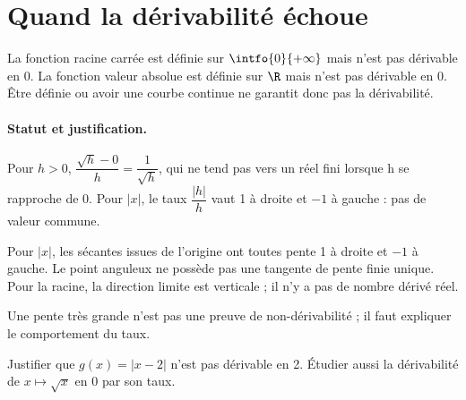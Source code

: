 \section{Quand la dérivabilité échoue}\label{C04-U4}
\begin{keypoint}
La fonction racine carrée est définie sur $\intfo{0}{+\infty}$ mais n’est pas dérivable en 0. La fonction valeur absolue est définie sur $\R$ mais n’est pas dérivable en 0. Être définie ou avoir une courbe continue ne garantit donc pas la dérivabilité.
\end{keypoint}
\paragraph{Statut et justification.} Pour $h>0$, $\dfrac{\sqrt h-0}{h}=\dfrac{1}{\sqrt h}$, qui ne tend pas vers un réel fini lorsque h se rapproche de 0. Pour $|x|$, le taux $\dfrac{|h|}{h}$ vaut 1 à droite et $-1$ à gauche : pas de valeur commune.
\begin{example}Pour $|x|$, les sécantes issues de l’origine ont toutes pente 1 à droite et $-1$ à gauche. Le point anguleux ne possède pas une tangente de pente finie unique. Pour la racine, la direction limite est verticale ; il n’y a pas de nombre dérivé réel.\end{example}\label{C04-EX4}
\begin{pitfall}Une pente très grande n’est pas une preuve de non-dérivabilité ; il faut expliquer le comportement du taux.\end{pitfall}
\begin{application}Justifier que $g(x)=|x-2|$ n’est pas dérivable en 2. Étudier aussi la dérivabilité de $x\mapsto\sqrt{x}$ en 0 par son taux.\end{application}\label{C04-AP4}
\mxnewpage

